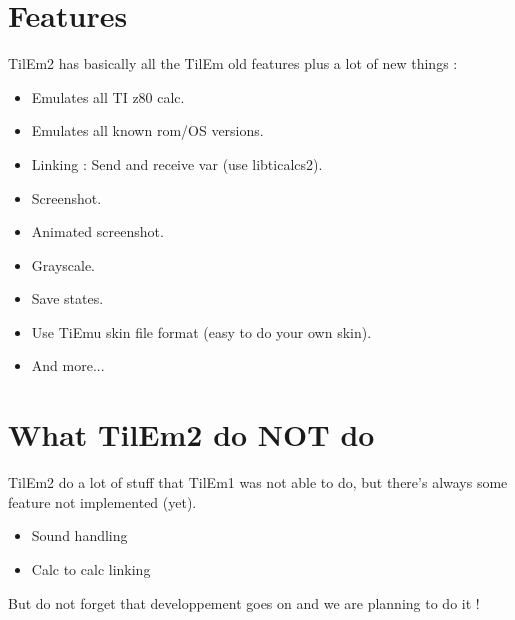 \documentclass[10pt]{report}
\begin{document}
\section{Features}
TilEm2 has basically all the TilEm old features plus a lot of new things :\newline
\begin{itemize}
\item   Emulates all TI z80 calc.
\item	Emulates all known rom/OS versions.
\item	Linking : Send and receive var (use libticalcs2). 
\item	Screenshot.
\item	Animated screenshot. 
\item	Grayscale. 
\item	Save states.
\item	Use TiEmu skin file format (easy to do your own skin).
\item	And more...
\end{itemize}

\section{What TilEm2 do NOT do}
TilEm2 do a lot of stuff that TilEm1 was not able to do, but there's always some feature not implemented (yet).\newline
\begin{itemize}
\item Sound handling
\item Calc to calc linking
\end{itemize}
But do not forget that developpement goes on and we are planning to do it !\newline
\end{document}
